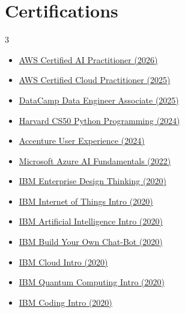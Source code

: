 \documentclass[letterpaper,11pt]{article}
\begin{document}
\section{Certifications}
    \setlength{\columnsep}{-10pt}
    \begin{multicols}{3}
        \begin{itemize}[itemsep=-2.5pt, parsep=2.5pt]
            \small
            \item{\href{https://www.credly.com/badges/9f0969dd-abdb-4bef-a715-0381be726772/public_url}{AWS Certified AI Practitioner (2026)}}
            \item{\href{https://www.credly.com/badges/6f61813a-20f7-4b96-a6f5-57c9b959f4f9/public_url}{AWS Certified Cloud Practitioner (2025)}}
            \item{\href{https://www.datacamp.com/certificate/DEA0011165135933}{DataCamp Data Engineer Associate (2025)}}
            \item{\href{https://cs50.harvard.edu/certificates/8907c732-791d-40c1-93ab-71bf66c02c63}{Harvard CS50 Python Programming (2024)}}
            \item{\href{https://www.futurelearn.com/certificates/09u23j2}{Accenture User Experience (2024)}}
            \item{\href{https://www.credly.com/badges/77105366-fd71-42b8-947e-4a97a040f79a/public_url}{Microsoft Azure AI Fundamentals (2022)}}
            \item{\href{https://www.credly.com/badges/255a3c80-3931-41f3-a273-0f1e731d4d6f/public_url}{IBM Enterprise Design Thinking (2020)}}
            \item{\href{https://www.credly.com/badges/d38723c4-cff4-4558-b9e6-a8fa47048195/public_url}{IBM Internet of Things Intro (2020)}}
            \item{\href{https://www.credly.com/badges/5e4dd9d6-c2f1-43d5-ade0-91ac1687624c/public_url}{IBM Artificial Intelligence Intro (2020)}}
            \item{\href{https://www.credly.com/badges/76a78578-5add-46d6-a04d-a45d07880a61/public_url}{IBM Build Your Own Chat-Bot (2020)}}
            \item{\href{https://www.credly.com/badges/366d28af-bd8b-4d66-8e88-3642ce1530a1/public_url}{IBM Cloud Intro (2020)}}
            \item{\href{https://www.credly.com/badges/ffc25c4c-bc60-44bf-b17b-7a2024f6f05b/public_url}{IBM Quantum Computing Intro (2020)}}
            \item{\href{https://www.credly.com/badges/065dba2a-90db-4b89-83e4-58d26c26a80c/public_url}{IBM Coding Intro (2020)}}
        \end{itemize}
    \end{multicols}
    \vspace*{2.0\multicolsep}
\end{document}
